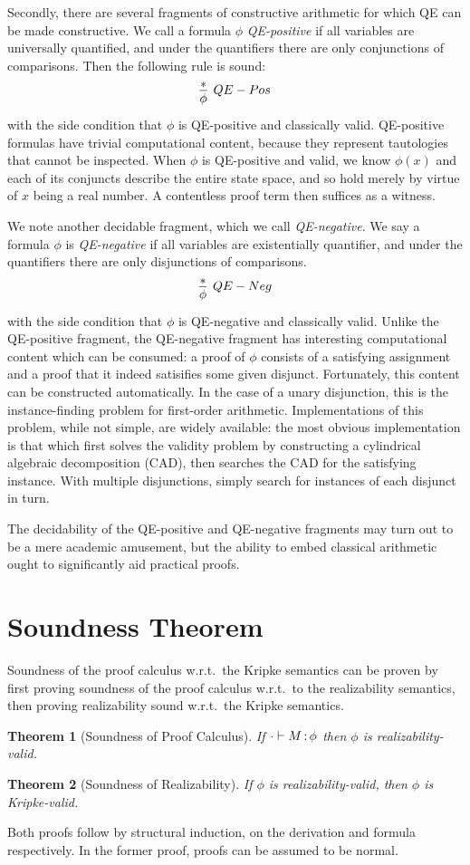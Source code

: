 \documentclass[12pt]{cmuthesis}
\newtheorem{theorem}{Theorem}
\theoremstyle{definition}
\theoremstyle{remark}
\begin{document}
Secondly, there are several fragments of constructive arithmetic for which QE can be made constructive.
We call a formula $\phi$ \emph{QE-positive} if all variables are universally quantified, and under the quantifiers there are only conjunctions of comparisons.
Then the following rule is sound:
\[\infer[QE-Pos]{\phi}{*}\] with the side condition that $\phi$ is  QE-positive and classically valid.
QE-positive formulas have trivial computational content, because they represent tautologies that cannot be inspected.
When $\phi$ is QE-positive and valid, we know $\phi(x)$ and each of its conjuncts describe the entire state space, and so hold merely by virtue of $x$ being a real number.
A contentless proof term then suffices as a witness.

We note another decidable fragment, which we call \emph{QE-negative}.
We say a formula $\phi$ is \emph{QE-negative} if all variables are existentially quantifier, and under the quantifiers there are  only disjunctions of comparisons.
\[\infer[QE-Neg]{\phi}{*}\] with the side condition that $\phi$ is  QE-negative and classically valid.
Unlike the QE-positive fragment, the QE-negative fragment has interesting computational content which can be consumed: a proof of $\phi$ consists of a satisfying assignment and a proof that it indeed satisifies some given disjunct.
Fortunately, this content can be constructed automatically.
In the case of a unary disjunction, this is the instance-finding problem for first-order arithmetic.
Implementations of this problem, while not simple, are widely available: the most obvious implementation is that which first solves the validity problem by constructing a cylindrical algebraic decomposition (CAD), then searches the CAD for the satisfying instance.
With multiple disjunctions, simply search for instances of each disjunct in turn.

The decidability of the QE-positive and QE-negative fragments may turn out to be a mere academic amusement, but the ability to embed classical arithmetic ought to significantly aid practical proofs.

\section{Soundness Theorem}
Soundness of the proof calculus w.r.t.\ the Kripke semantics can be proven by first proving soundness of the proof calculus w.r.t.\ to the realizability semantics,
then proving realizability sound w.r.t.\ the Kripke semantics.
\begin{theorem}[Soundness of Proof Calculus]
  If $\cdot \vdash M\mathop{:}\phi$ then $\phi$ is realizability-valid.
\end{theorem}
\begin{theorem}[Soundness of Realizability]
  If $\phi$ is realizability-valid, then $\phi$ is Kripke-valid.
\end{theorem}
Both proofs follow by structural induction, on the derivation and formula respectively.
In the former proof, proofs can be assumed to be normal.
\end{document}
